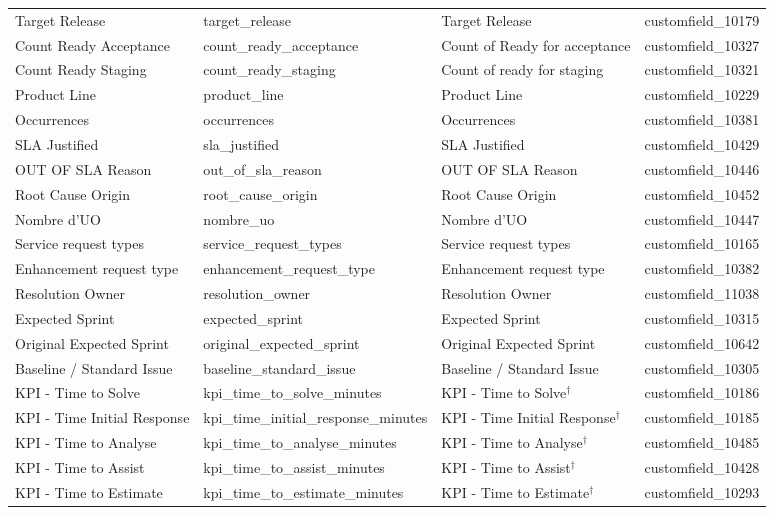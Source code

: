 \documentclass[12pt, a4paper]{article}
\begin{document}
\begin{longtable}{>{\small}p{3.6cm} >{\ttfamily\small}p{3.2cm} >{\small}p{3.0cm} >{\ttfamily\small}p{3.0cm}}
    Target Release             & target\_release            & Target Release               & customfield\_10179 \\
    Count Ready Acceptance     & count\_ready\_acceptance   & Count of Ready for acceptance & customfield\_10327 \\
    Count Ready Staging        & count\_ready\_staging      & Count of ready for staging   & customfield\_10321 \\
    Product Line               & product\_line              & Product Line                 & customfield\_10229 \\
    Occurrences                & occurrences                & Occurrences                  & customfield\_10381 \\
    SLA Justified              & sla\_justified             & SLA Justified                & customfield\_10429 \\
    OUT OF SLA Reason          & out\_of\_sla\_reason       & OUT OF SLA Reason            & customfield\_10446 \\
    Root Cause Origin          & root\_cause\_origin        & Root Cause Origin            & customfield\_10452 \\
    Nombre d'UO                & nombre\_uo                 & Nombre d'UO                  & customfield\_10447 \\
    Service request types      & service\_request\_types    & Service request types        & customfield\_10165 \\
    Enhancement request type   & enhancement\_request\_type & Enhancement request type     & customfield\_10382 \\
    Resolution Owner           & resolution\_owner          & Resolution Owner             & customfield\_11038 \\
    Expected Sprint            & expected\_sprint           & Expected Sprint              & customfield\_10315 \\
    Original Expected Sprint   & original\_expected\_sprint & Original Expected Sprint     & customfield\_10642 \\
    Baseline / Standard Issue  & baseline\_standard\_issue  & Baseline / Standard Issue    & customfield\_10305 \\
    KPI - Time to Solve        & kpi\_time\_to\_solve\_minutes      & KPI - Time to Solve$^\dagger$  & customfield\_10186 \\
    KPI - Time Initial Response & kpi\_time\_initial\_response\_minutes & KPI - Time Initial Response$^\dagger$ & customfield\_10185 \\
    KPI - Time to Analyse      & kpi\_time\_to\_analyse\_minutes    & KPI - Time to Analyse$^\dagger$ & customfield\_10485 \\
    KPI - Time to Assist       & kpi\_time\_to\_assist\_minutes     & KPI - Time to Assist$^\dagger$ & customfield\_10428 \\
    KPI - Time to Estimate     & kpi\_time\_to\_estimate\_minutes   & KPI - Time to Estimate$^\dagger$ & customfield\_10293 \\


\end{longtable}
\end{document}
